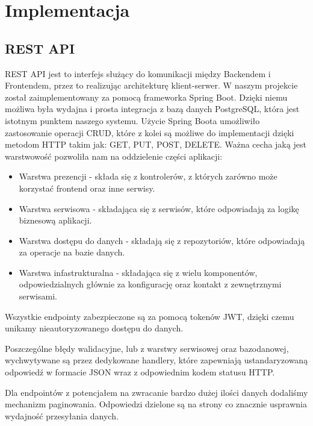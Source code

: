 
\chapter{Implementacja}

\section{REST API}
REST API jest to interfejs służący do komunikacji między Backendem i Frontendem, przez to realizując architekturę klient-serwer. W naszym projekcie został zaimplementowany 
za pomocą frameworka Spring Boot. Dzięki niemu możliwa była wydajna i prosta integracja z bazą danych PostgreSQL, która jest istotnym
punktem naszego systemu. Użycie Spring Boota umożliwiło zastosowanie operacji CRUD, które z kolei są możliwe do implementacji dzięki 
metodom HTTP takim jak: GET, PUT, POST, DELETE. Ważna cecha jaką jest warstwowość pozwoliła nam na oddzielenie części aplikacji:
\begin{itemize}
    \item Warstwa prezencji - składa się z kontrolerów, z których zarówno może korzystać frontend oraz inne serwisy.
    \item Warstwa serwisowa - składająca się z serwisów, które odpowiadają za logikę biznesową aplikacji.
    \item Warstwa dostępu do danych - składają się z repozytoriów, które odpowiadają za operacje na bazie danych.
    \item Warstwa infastrukturalna - składająca się z wielu komponentów, odpowiedzialnych głównie za konfigurację oraz kontakt z zewnętrznymi
    serwisami.
\end{itemize}

Wszystkie endpointy zabezpieczone są za pomocą tokenów JWT, dzięki czemu unikamy nieautoryzowanego dostępu do danych. 

Poszczególne błędy walidacyjne, lub z warstwy serwisowej oraz bazodanowej, wychwytywane są przez dedykowane handlery, które zapewniają ustandaryzowaną odpowiedź w formacie JSON wraz z
odpowiednim kodem statusu HTTP. 

Dla endpointów z potencjałem na zwracanie bardzo dużej ilości danych dodaliśmy mechanizm paginowania. Odpowiedzi dzielone są na strony 
co znacznie usprawnia wydajność przesyłania danych.

